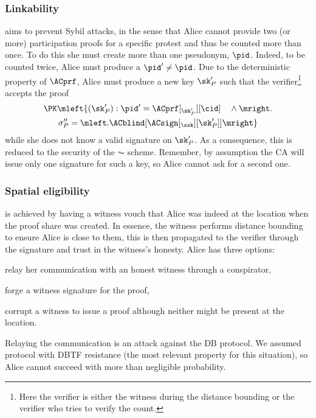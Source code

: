 \subsubsection{Linkability}%
\label{analysis-linkability}

 aims to prevent Sybil attacks, in the sense
that Alice cannot provide two (or more) participation proofs for a
specific protest and thus be counted more than once.
To do this she must create more than one pseudonym, \(\pid\).
Indeed, to be counted twice, Alice must produce a \(\pid'\neq \pid\).
Due to the deterministic property of \(\ACprf\), Alice must produce a new key 
\(\sk_P'\) such that the verifier\footnote{%
  Here the verifier is either the witness during the distance bounding or the 
  verifier who tries to verify the count.
} accepts the proof
\begin{multline*}
\PK\mleft\{ (\sk_P') : \pid' = \ACprf[_{\sk_P'}][\cid] \quad \land \mright. \\
    \sigma_P'' = \mleft. \ACblind[\ACsign[_{\ssk}][\sk_P']] \mright\}
\end{multline*}
while she does not know a valid signature on \(\sk_P'\).
As a consequence, this is reduced to the security of the \(\AC\) scheme.
Remember, by assumption the \ac{CA} will issue only one signature for such a 
key, so Alice cannot ask for a second one.

\subsubsection{Spatial eligibility}%
\label{analysis-spatial}

 is achieved by having a witness vouch that Alice was 
indeed at the location when the proof share was created.
In essence, the witness performs distance bounding to ensure Alice is close to 
them, this is then propagated to the verifier through the signature and trust 
in the witness's honesty.
Alice has three options:
\begin{enumerate*}
\item\label{spatial-DF} relay her communication with an honest witness through 
  a conspirator,
\item\label{spatial-forge} forge a witness signature for the proof,
\item corrupt a witness to issue a proof although neither might be present at 
  the location.
\end{enumerate*}

Relaying the communication is an attack against the \ac{DB} protocol.
We assumed  protocol with \ac{DBTF} resistance (the most relevant 
property for this situation), so Alice cannot succeed with more than negligible 
probability.
 
